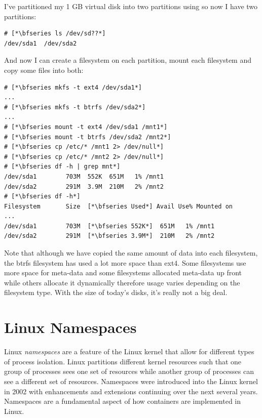 I've partitioned my 1 GB virtual disk into two partitions using  so now I have two partitions:

\begin{lstlisting}
# [*\bfseries ls /dev/sd??*]
/dev/sda1  /dev/sda2
\end{lstlisting}

\noindent
And now I can create a filesystem on each partition, mount each filesystem and copy some files into both:

\begin{lstlisting}
# [*\bfseries mkfs -t ext4 /dev/sda1*]
...
# [*\bfseries mkfs -t btrfs /dev/sda2*]
...
# [*\bfseries mount -t ext4 /dev/sda1 /mnt1*]
# [*\bfseries mount -t btrfs /dev/sda2 /mnt2*]
# [*\bfseries cp /etc/* /mnt1 2> /dev/null*]
# [*\bfseries cp /etc/* /mnt2 2> /dev/null*]
# [*\bfseries df -h | grep mnt*]
/dev/sda1        703M  552K  651M   1% /mnt1
/dev/sda2        291M  3.9M  210M   2% /mnt2
# [*\bfseries df -h*]
Filesystem       Size  [*\bfseries Used*] Avail Use% Mounted on
...
/dev/sda1        703M  [*\bfseries 552K*]  651M   1% /mnt1
/dev/sda2        291M  [*\bfseries 3.9M*]  210M   2% /mnt2
\end{lstlisting}

\noindent
Note that although we have copied the same amount of data into each filesystem, the btrfs filesystem has used a lot more space than ext4. Some filesystems use more space for meta-data and some filesystems allocated meta-data up front while others allocate it dynamically therefore usage varies depending on the filesystem type. With the size of today's disks, it's really not a big deal.


\section{Linux Namespaces}


Linux \textit{namespaces} are a feature of the Linux kernel that allow for different types of process isolation. Linux partitions different kernel resources such that one group of processes sees one set of resources while another group of processes can see a different set of resources. Namespaces were introduced into the Linux kernel in 2002 with enhancements and extensions continuing over the next several years. Namespaces are a fundamental aspect of how containers are implemented in Linux.

